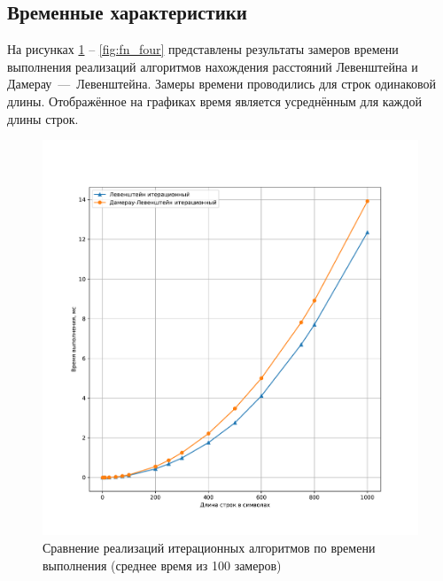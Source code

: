 \newpage

\subsection{Временные характеристики}

На рисунках \ref{fig:fn_iter} -- \ref{fig:fn_four} представлены результаты замеров времени выполнения реализаций алгоритмов нахождения расстояний Левенштейна и Дамерау~---~Левенштейна.
Замеры времени проводились для строк одинаковой длины.
Отображённое на графиках время является усреднённым для каждой длины строк.

\begin{figure}[H]
	\centering
	\includegraphics[width=\textwidth]{img/fn_iter.pdf}
	\caption{Сравнение реализаций итерационных алгоритмов по времени выполнения (среднее время из 100 замеров)}
	\label{fig:fn_iter}
\end{figure}

